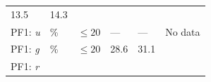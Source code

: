\documentclass[DM,toc]{lsstdoc}
\begin{document}
\begin{longtable}[]{@{}llllll@{}}
\begin{minipage}[t]{0.12\columnwidth}
13.5\strut
\end{minipage} & \begin{minipage}[t]{0.12\columnwidth}\raggedright\strut
14.3\strut
\end{minipage} & \begin{minipage}[t]{0.17\columnwidth}\raggedright\strut
\strut
\end{minipage}\tabularnewline
\begin{minipage}[t]{0.12\columnwidth}\raggedright\strut
PF1: \emph{u}\strut
\end{minipage} & \begin{minipage}[t]{0.06\columnwidth}\raggedright\strut
\%\strut
\end{minipage} & \begin{minipage}[t]{0.14\columnwidth}\raggedright\strut
\(\leq 20\)\strut
\end{minipage} & \begin{minipage}[t]{0.12\columnwidth}\raggedright\strut
---\strut
\end{minipage} & \begin{minipage}[t]{0.12\columnwidth}\raggedright\strut
---\strut
\end{minipage} & \begin{minipage}[t]{0.17\columnwidth}\raggedright\strut
No data\strut
\end{minipage}\tabularnewline
\begin{minipage}[t]{0.12\columnwidth}\raggedright\strut
PF1: \emph{g}\strut
\end{minipage} & \begin{minipage}[t]{0.06\columnwidth}\raggedright\strut
\%\strut
\end{minipage} & \begin{minipage}[t]{0.14\columnwidth}\raggedright\strut
\(\leq 20\)\strut
\end{minipage} & \begin{minipage}[t]{0.12\columnwidth}\raggedright\strut
28.6\strut
\end{minipage} & \begin{minipage}[t]{0.12\columnwidth}\raggedright\strut
31.1\strut
\end{minipage} & \begin{minipage}[t]{0.17\columnwidth}\raggedright\strut
\strut
\end{minipage}\tabularnewline
\begin{minipage}[t]{0.12\columnwidth}\raggedright\strut
PF1: \emph{r}\strut
\end{minipage} & \begin{minipage}[t]{0.06\columnwidth}\raggedright\strut

\end{minipage}
\end{longtable}
\end{document}

